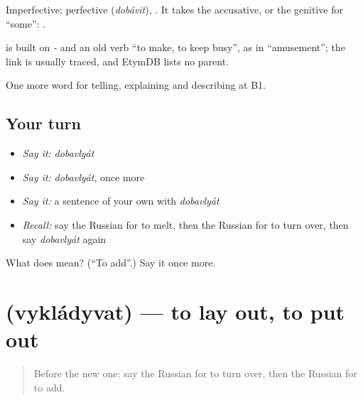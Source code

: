 Imperfective; perfective \emph{} (\emph{dobávit}), \emph{}. It takes the accusative, or the genitive for \textquotedblleft{}some\textquotedblright{}: \emph{ }.

\begin{cousinweb}
\emph{} is built on \emph{-} and an old verb \emph{} \textquotedblleft{}to make, to keep busy\textquotedblright{}, as in \emph{} \textquotedblleft{}amusement\textquotedblright{}; the link is usually traced, and EtymDB lists no parent.
\end{cousinweb}

\begin{grammarlens}[title={What you've built}]
One more word for telling, explaining and describing at B1.
\end{grammarlens}

\subsection*{Your turn}
\begin{itemize}
\raggedright
  \item \emph{Say it:} \emph{dobavlyát}
  \item \emph{Say it:} \emph{dobavlyát}, once more
  \item \emph{Say it:} a sentence of your own with \emph{dobavlyát}
  \item \emph{Recall:} say the Russian for to melt, then the Russian for to turn over, then say \emph{dobavlyát} again
\end{itemize}

\begin{tcolorbox}[breakable,colback=teal!4,colframe=teal!35!black,title={Before you move on}]
What does  mean? (\textquotedblleft{}To add\textquotedblright{}.) Say it once more.
\end{tcolorbox}
\section[\texorpdfstring{\ru{выкладывать} (vykládyvat)}{выкладывать (vykládyvat)}]{ (vykládyvat) — to lay out, to put out}

\label{lesson:RU-C336-vykladyvat}



\begin{quote}
Before the new one: say the Russian for to turn over, then the Russian for to add.
\end{quote}

